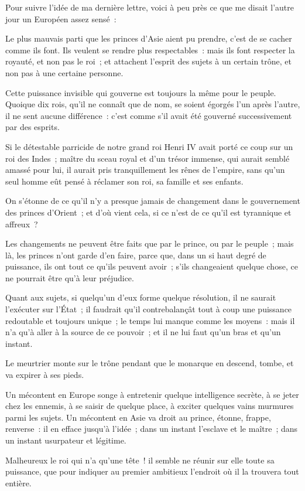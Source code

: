 \documentclass[french,twoside]{book} %
\begin{document}
\noindent Pour suivre l’idée de ma dernière lettre, voici à peu près ce que me disait l’autre jour un Européen assez sensé :\par
Le plus mauvais parti que les princes d’Asie aient pu prendre, c’est de se cacher comme ils font. Ils veulent se rendre plus respectables : mais ils font respecter la royauté, et non pas le roi ; et attachent l’esprit des sujets à un certain trône, et non pas à une certaine personne.\par
Cette puissance invisible qui gouverne est toujours la même pour le peuple. Quoique dix rois, qu’il ne connaît que de nom, se soient égorgés l’un après l’autre, il ne sent aucune différence : c’est comme s’il avait été gouverné successivement par des esprits.\par
Si le détestable parricide de notre grand roi Henri IV avait porté ce coup sur un roi des Indes ; maître du sceau royal et d’un trésor immense, qui aurait semblé amassé pour lui, il aurait pris tranquillement les rênes de l’empire, sans qu’un seul homme eût pensé à réclamer son roi, sa famille et ses enfants.\par
On s’étonne de ce qu’il n’y a presque jamais de changement dans le gouvernement des princes d’Orient ; et d’où vient cela, si ce n’est de ce qu’il est tyrannique et affreux ?\par
Les changements ne peuvent être faits que par le prince, ou par le peuple ; mais là, les princes n’ont garde d’en faire, parce que, dans un si haut degré de puissance, ils ont tout ce qu’ils peuvent avoir ; s’ils changeaient quelque chose, ce ne pourrait être qu’à leur préjudice.\par
Quant aux sujets, si quelqu’un d’eux forme quelque résolution, il ne saurait l’exécuter sur l’État ; il faudrait qu’il contrebalançât tout à coup une puissance redoutable et toujours unique ; le temps lui manque comme les moyens : mais il n’a qu’à aller à la source de ce pouvoir ; et il ne lui faut qu’un bras et qu’un instant.\par
Le meurtrier monte sur le trône pendant que le monarque en descend, tombe, et va expirer à ses pieds.\par
Un mécontent en Europe songe à entretenir quelque intelligence secrète, à se jeter chez les ennemis, à se saisir de quelque place, à exciter quelques vains murmures parmi les sujets. Un mécontent en Asie va droit au prince, étonne, frappe, renverse : il en efface jusqu’à l’idée ; dans un instant l’esclave et le maître ; dans un instant usurpateur et légitime.\par
Malheureux le roi qui n’a qu’une tête ! il semble ne réunir sur elle toute sa puissance, que pour indiquer au premier ambitieux l’endroit où il la trouvera tout entière.\par
\end{document}
